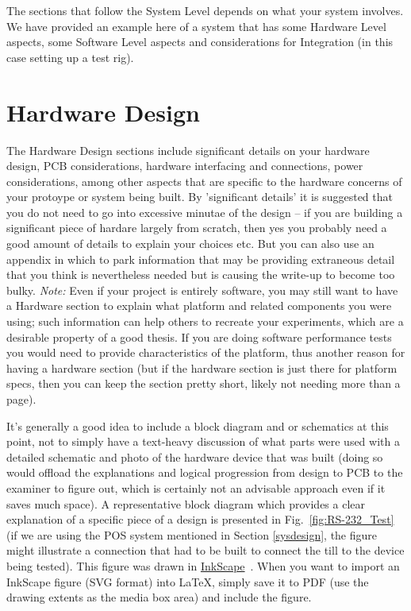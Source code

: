 The sections that follow the System Level depends on what your system involves. We have provided an example here of a system that has some Hardware Level aspects, some Software Level aspects and considerations for Integration (in this case setting up a test rig).


\section{Hardware Design}
\label{hwdesign}

The Hardware Design sections include significant details on your hardware design, PCB considerations, hardware interfacing and connections, power considerations, among other aspects that are specific to the hardware concerns of your protoype or system being built. By 'significant details' it is suggested that you do not need to go into excessive minutae of the design -- if you are building a significant piece of hardare largely from scratch, then yes you probably need a good amount of details to explain your choices etc. But you can also use an appendix in which to park information that may be providing extraneous detail that you think is nevertheless needed but is causing the write-up to become too bulky. \emph{Note:} Even if your project is entirely software, you may still want to have a Hardware section to explain what platform and related components you were using; such information can help others to recreate your experiments, which are a desirable property of a good thesis. If you are doing software performance tests you would need to provide characteristics of the platform, thus another reason for having a hardware section (but if the hardware section is just there for platform specs, then you can keep the section pretty short, likely not needing more than a page).

It's generally a good idea to include a block diagram and or schematics at this point, not to simply have a text-heavy discussion of what parts were used with a detailed schematic and photo of the hardware device that was built (doing so would offload the explanations and logical progression from design to PCB to the examiner to figure out, which is certainly not an advisable approach even if it saves much space).  A representative block diagram which provides a clear explanation of a specific piece of a design is presented in Fig.~\ref{fig:RS-232_Test} (if we are using the POS system mentioned in Section \ref{sysdesign}, the figure might illustrate a connection that had to be built to connect the till to the device being tested).  This figure was drawn in \href{http://www.inkscape.org/}{InkScape}~\cite{InkScape}.  When you want to import an InkScape figure (SVG format) into \LaTeX{}, simply save it to PDF (use the drawing extents as the media box area) and include the figure.

